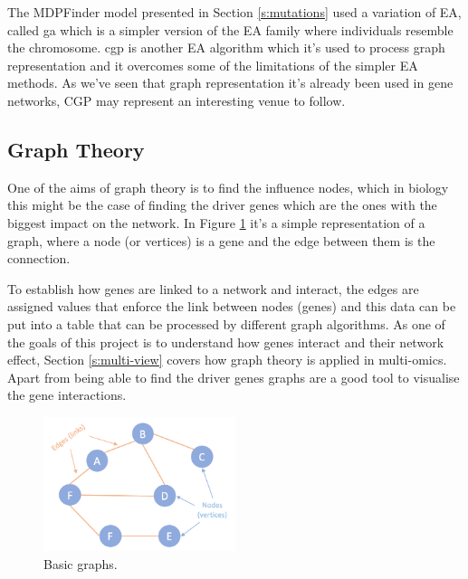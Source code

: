 The MDPFinder model presented in Section \ref{s:mutations} used a variation of EA, called \acrfull{ga} which is a simpler version of the EA family where individuals resemble the chromosome. \acrfull{cgp} is another EA algorithm which it's used to process graph representation and it overcomes some of the limitations of the simpler EA methods. As we've seen that graph representation it's already been used in gene networks, CGP may represent an interesting venue to follow. 


\subsection{Graph Theory} \label{s:graph_overview}

One of the aims of graph theory is to find the influence nodes, which in biology this might be the case of finding the driver genes which are the ones with the biggest impact on the network. In Figure \ref{fig:graphs_basic} it's a simple representation of a graph, where a node (or vertices) is a gene and the edge between them is the connection. 

To establish how genes are linked to a network and interact,  the edges are assigned values that enforce the link between nodes (genes) and this data can be put into a table that can be processed by different graph algorithms. As one of the goals of this project is to understand how genes interact and their network effect, 
    Section \ref{s:multi-view} covers how graph theory is applied in multi-omics. Apart from being able to find the driver genes graphs are a good tool to visualise the gene interactions. 

\begin{figure}[!htb]
  \centering\includegraphics[width=0.5\textwidth,height=0.5\textheight,keepaspectratio]{Sections/Lit_review/Resources/basic_graphs.png}
    \caption{Basic graphs.}
    \label{fig:graphs_basic}
\end{figure}
\FloatBarrier




